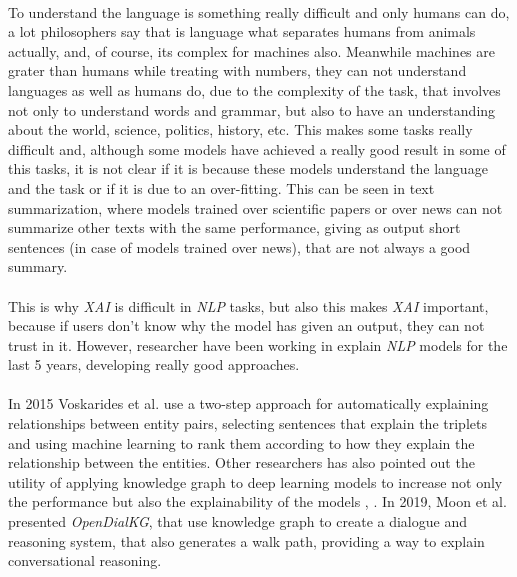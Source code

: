 \paragraph{}
To understand the language is something really difficult and only humans can do, a lot philosophers say that is language what separates humans from animals actually, and, of course, its complex for machines also. Meanwhile machines are grater than humans while treating with numbers, they can not understand languages as well as humans do, due to the complexity of the task, that involves not only to understand words and grammar, but also to have an understanding about the world, science, politics, history, etc. This makes some tasks really difficult and, although some models have achieved a really good result in some of this tasks, it is not clear if it is because these models understand the language and the task or if it is due to an over-fitting. This can be seen in text summarization, where models trained over scientific papers or over news can not summarize other texts with the same performance, giving as output short sentences (in case of models trained over news), that are not always a good summary.
\paragraph{}
This is why \emph{XAI} is difficult in \emph{NLP} tasks, but also this makes \emph{XAI} important, because if users don't know why the model has given an output, they can not trust in it. However, researcher have been working in explain \emph{NLP} models for the last 5 years, developing really good approaches.
\paragraph{}
In 2015 Voskarides et al.\cite{Voskarides2015} use a two-step approach for automatically explaining relationships between entity pairs, selecting sentences that explain the triplets and using machine learning to rank them according to how they explain the relationship between the entities. Other researchers has also pointed out the utility of applying knowledge graph to deep learning models to increase not only the performance but also the explainability of the models \cite{Palmonari2020}, \cite{Lecue2020}. In 2019, Moon et al. presented \emph{OpenDialKG}\cite{Moon2019}, that use knowledge graph to create a dialogue and reasoning system, that also generates a walk path, providing a way to explain conversational reasoning. 
